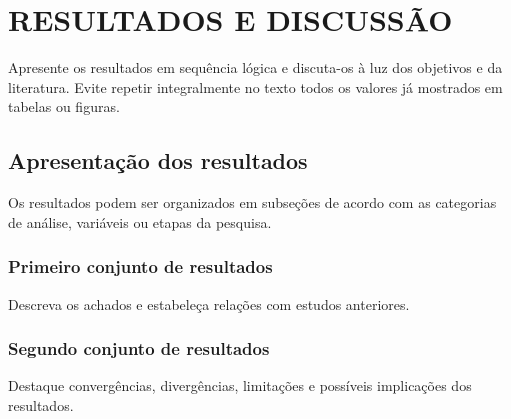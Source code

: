 
\chapter{RESULTADOS E DISCUSSÃO}

Apresente os resultados em sequência lógica e discuta-os à luz dos objetivos e da literatura. Evite repetir integralmente no texto todos os valores já mostrados em tabelas ou figuras.

\section{Apresentação dos resultados}

Os resultados podem ser organizados em subseções de acordo com as categorias de análise, variáveis ou etapas da pesquisa.

\subsection{Primeiro conjunto de resultados}

Descreva os achados e estabeleça relações com estudos anteriores.

\subsection{Segundo conjunto de resultados}

Destaque convergências, divergências, limitações e possíveis implicações dos resultados.
